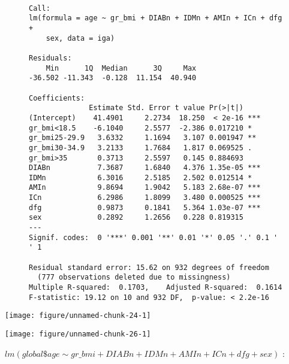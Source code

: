 \documentclass[11pt,a4paper]{article}\usepackage[]{graphicx}\usepackage[]{color}
\makeatletter
\def\maxwidth{ %
  \ifdim\Gin@nat@width>\linewidth
    \linewidth
  \else
    \Gin@nat@width
  \fi
}
\newenvironment{kframe}{%
 \def\at@end@of@kframe{}%
 \ifinner\ifhmode%
  \def\at@end@of@kframe{\end{minipage}}%
  \begin{minipage}{\columnwidth}%
 \fi\fi%
 \def\FrameCommand##1{\hskip\@totalleftmargin \hskip-\fboxsep
 \colorbox{shadecolor}{##1}\hskip-\fboxsep
     \hskip-\linewidth \hskip-\@totalleftmargin \hskip\columnwidth}%
 \MakeFramed {\advance\hsize-\width
   \@totalleftmargin\z@ \linewidth\hsize
   \@setminipage}}%
 {\par\unskip\endMakeFramed%
 \at@end@of@kframe}
\newenvironment{knitrout}{}{} %
\makeatother
\begin{document}
\begin{figure}[H]
\begin{knitrout}
\color{fgcolor}\begin{kframe}
\begin{verbatim}

Call:
lm(formula = age ~ gr_bmi + DIABn + IDMn + AMIn + ICn + dfg + 
    sex, data = iga)

Residuals:
    Min      1Q  Median      3Q     Max 
-36.502 -11.343  -0.128  11.154  40.940 

Coefficients:
              Estimate Std. Error t value Pr(>|t|)    
(Intercept)    41.4901     2.2734  18.250  < 2e-16 ***
gr_bmi<18.5    -6.1040     2.5577  -2.386 0.017210 *  
gr_bmi25-29.9   3.6332     1.1694   3.107 0.001947 ** 
gr_bmi30-34.9   3.2133     1.7684   1.817 0.069525 .  
gr_bmi>35       0.3713     2.5597   0.145 0.884693    
DIABn           7.3687     1.6840   4.376 1.35e-05 ***
IDMn            6.3016     2.5185   2.502 0.012514 *  
AMIn            9.8694     1.9042   5.183 2.68e-07 ***
ICn             6.2986     1.8099   3.480 0.000525 ***
dfg             0.9873     0.1841   5.364 1.03e-07 ***
sex             0.2892     1.2656   0.228 0.819315    
---
Signif. codes:  0 '***' 0.001 '**' 0.01 '*' 0.05 '.' 0.1 ' ' 1

Residual standard error: 15.62 on 932 degrees of freedom
  (777 observations deleted due to missingness)
Multiple R-squared:  0.1703,	Adjusted R-squared:  0.1614 
F-statistic: 19.12 on 10 and 932 DF,  p-value: < 2.2e-16
\end{verbatim}
\end{kframe}
\end{knitrout}
\end{figure}

\begin{knitrout}
\color{fgcolor}
\texttt{[image: figure/unnamed-chunk-24-1]} 

\end{knitrout}



\begin{knitrout}
\color{fgcolor}
\texttt{[image: figure/unnamed-chunk-26-1]} 

\end{knitrout}

$lm(global\mathdollar age\sim gr\_bmi + DIABn + IDMn + AMIn + ICn + dfg + sex)$ :
\end{document}
